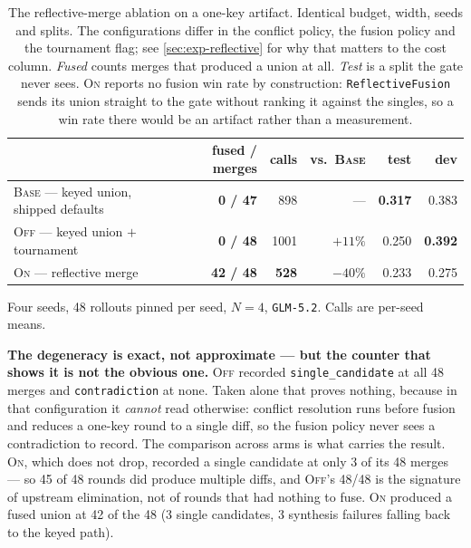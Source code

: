 \documentclass{article}
\newcommand{\code}[1]{\texttt{#1}}
\begin{document}
\begin{table}[t]
\centering
\small
\caption{The reflective-merge ablation on a one-key artifact. Identical budget, width, seeds and splits. The configurations differ in the conflict policy, the fusion policy and the tournament flag; see \cref{sec:exp-reflective} for why that matters to the cost column. \emph{Fused} counts merges that produced a union at all. \emph{Test} is a split the gate never sees. \textsc{On} reports no fusion win rate by construction: \code{ReflectiveFusion} sends its union straight to the gate without ranking it against the singles, so a win rate there would be an artifact rather than a measurement.}
\label{tab:reflective}
\begin{tabular}{@{}lrrrrr@{}}
\toprule
& \textbf{fused / merges} & \textbf{calls} & \textbf{vs.\ \textsc{Base}} & \textbf{test} & \textbf{dev} \\
\midrule
\textsc{Base} --- keyed union, shipped defaults & \textbf{0 / 47} & 898 & --- & \textbf{0.317} & 0.383 \\
\textsc{Off} --- keyed union $+$ tournament & \textbf{0 / 48} & 1001 & $+11\%$ & 0.250 & \textbf{0.392} \\
\textsc{On} --- reflective merge & \textbf{42 / 48} & \textbf{528} & \textbf{$-40\%$} & 0.233 & 0.275 \\
\bottomrule
\end{tabular}

\vspace{2pt}
{\scriptsize Four seeds, 48 rollouts pinned per seed, $N{=}4$, \code{GLM-5.2}. Calls are per-seed means.}
\end{table}

\textbf{The degeneracy is exact, not approximate --- but the counter that shows it is not the obvious one.} \textsc{Off} recorded \code{single\_candidate} at all 48 merges and \code{contradiction} at none. Taken alone that proves nothing, because in that configuration it \emph{cannot} read otherwise: conflict resolution runs before fusion and reduces a one-key round to a single diff, so the fusion policy never sees a contradiction to record. The comparison across arms is what carries the result. \textsc{On}, which does not drop, recorded a single candidate at only 3 of its 48 merges --- so 45 of 48 rounds did produce multiple diffs, and \textsc{Off}'s 48/48 is the signature of upstream elimination, not of rounds that had nothing to fuse. \textsc{On} produced a fused union at 42 of the 48 (3 single candidates, 3 synthesis failures falling back to the keyed path).
\end{document}
